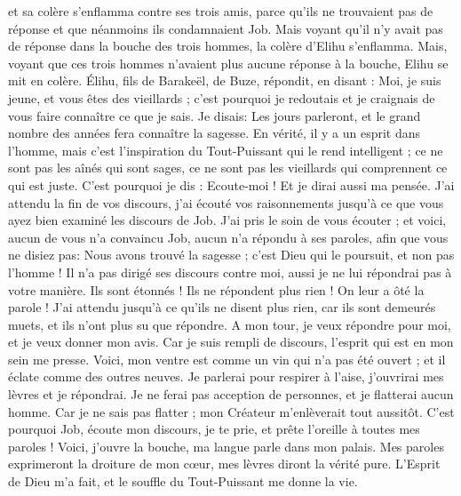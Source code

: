 \begin{multicols}{2}
et sa colère s'enflamma contre ses trois amis, parce qu'ils ne trouvaient pas de réponse et que néanmoins ils condamnaient Job. 
Mais voyant qu'il n'y avait pas de réponse dans la bouche des trois hommes, la colère d'Elihu s'enflamma.
Mais, voyant que ces trois hommes n'avaient plus aucune réponse à la bouche, Elihu se mit en colère.
Élihu, fils de Barakeël, de Buze, répondit, en disant : Moi, je suis jeune, et vous êtes des vieillards ; c'est pourquoi je redoutais et je craignais de vous faire connaître ce que je sais. 
Je disais: Les jours parleront, et le grand nombre des années fera connaître la sagesse.
En vérité, il y a un esprit dans l'homme, mais c'est l'inspiration du Tout-Puissant qui le rend intelligent ;
ce ne sont pas les aînés qui sont sages, ce ne sont pas les vieillards qui comprennent ce qui est juste.
C'est pourquoi je dis : Ecoute-moi ! Et je dirai aussi ma pensée.
J'ai attendu la fin de vos discours, j'ai écouté vos raisonnements jusqu'à ce que vous ayez bien examiné les discours de Job.
J'ai pris le soin de vous écouter ; et voici, aucun de vous n'a convaincu Job, aucun n'a répondu à ses paroles,
afin que vous ne disiez pas: Nous avons trouvé la sagesse ; c'est Dieu qui le poursuit, et non pas l'homme !
Il n'a pas dirigé ses discours contre moi, aussi je ne lui répondrai pas à votre manière.
Ils sont étonnés ! Ils ne répondent plus rien ! On leur a ôté la parole !
J'ai attendu jusqu'à ce qu'ils ne disent plus rien, car ils sont demeurés muets, et ils n'ont plus su que répondre.
A mon tour, je veux répondre pour moi, et je veux donner mon avis.
Car je suis rempli de discours, l'esprit qui est en mon sein me presse.
Voici, mon ventre est comme un vin qui n'a pas été ouvert ; et il éclate comme des outres neuves.
Je parlerai pour respirer à l'aise, j'ouvrirai mes lèvres et je répondrai.
Je ne ferai pas acception de personnes, et je flatterai aucun homme.
Car je ne sais pas flatter ; mon Créateur m'enlèverait tout aussitôt.
\VerseOne{}C'est pourquoi Job, écoute mon discours, je te prie, et prête l'oreille à toutes mes paroles !
Voici, j'ouvre la bouche, ma langue parle dans mon palais.
Mes paroles exprimeront la droiture de mon cœur, mes lèvres diront la vérité pure.
L'Esprit de Dieu m'a fait, et le souffle du Tout-Puissant me donne la vie.

\end{multicols}
